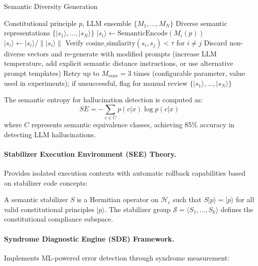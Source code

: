 \documentclass[manuscript,screen,9pt]{acmart}
\begin{document}
\begin{algorithm}[H]
\caption{Semantic Diversity Generation}
\label{alg:semantic_diversity}
\begin{algorithmic}[1]
\Require Constitutional principle $p$, LLM ensemble $\{M_1, \ldots, M_N\}$
\Ensure Diverse semantic representations $\{|s_1\rangle, \ldots, |s_N\rangle\}$
    \State $|s_i\rangle \leftarrow \text{SemanticEncode}(M_i(p))$
    \State $|s_i\rangle \leftarrow |s_i\rangle / \||s_i\rangle\|$ 
\EndFor
\State Verify $\text{cosine\_similarity}(s_i, s_j) < \tau$ for $i \neq j$ 
    \State Discard non-diverse vectors and re-generate with modified prompts (increase LLM temperature, add explicit semantic distance instructions, or use alternative prompt templates)
    \State Retry up to $M_{max} = 3$ times (configurable parameter, value used in experiments); if unsuccessful, flag for manual review
\EndIf
\State \Return $\{|s_1\rangle, \ldots, |s_N\rangle\}$
\end{algorithmic}
\end{algorithm}

The semantic entropy for hallucination detection is computed as:
$$SE = -\sum_{c \in C} p(c|x) \log p(c|x)$$
where $C$ represents semantic equivalence classes, achieving 85\% accuracy in detecting LLM hallucinations.

\paragraph{Stabilizer Execution Environment (SEE) Theory.} Provides isolated execution contexts with automatic rollback capabilities based on stabilizer code concepts:

\begin{definition}
A semantic stabilizer $S$ is a Hermitian operator on $\mathcal{H}_c$ such that $S|p\rangle = |p\rangle$ for all valid constitutional principles $|p\rangle$. The stabilizer group $\mathcal{S} = \langle S_1, \ldots, S_k \rangle$ defines the constitutional compliance subspace.
\end{definition}

\paragraph{Syndrome Diagnostic Engine (SDE) Framework.} Implements ML-powered error detection through syndrome measurement:
\end{document}
